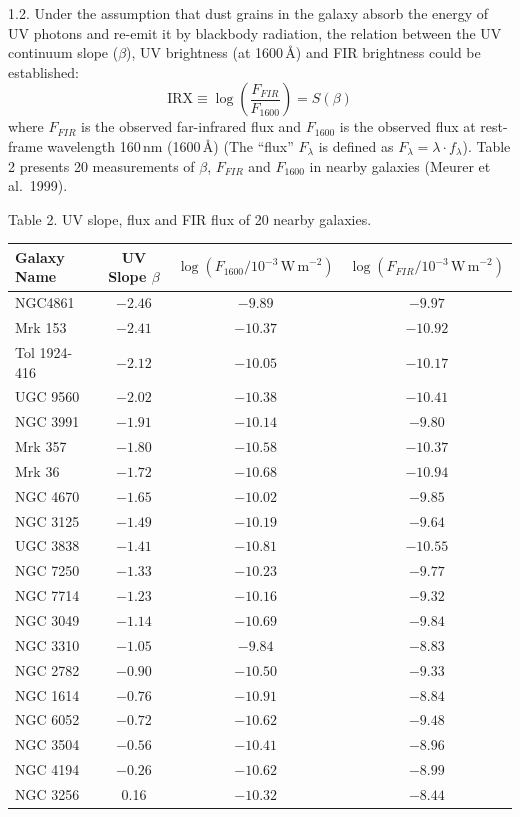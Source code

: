 1.2. Under the assumption that dust grains in the galaxy absorb the energy of
UV photons and re-emit it by blackbody radiation, the relation between the UV
continuum slope ($\beta$), UV brightness (at 1600\,\AA) and FIR brightness
could be established:
\[ \mathrm{IRX} \equiv \log\!\left(\frac{F_{FIR}}{F_{1600}}\right)
   = S(\beta) \]
where $F_{FIR}$ is the observed far-infrared flux and $F_{1600}$ is the
observed flux at rest-frame wavelength 160\,nm (1600\,\AA) (The ``flux''
$F_\lambda$ is defined as $F_\lambda = \lambda \cdot f_\lambda$). Table 2
presents 20 measurements of $\beta$, $F_{FIR}$ and $F_{1600}$ in nearby
galaxies (Meurer et al.\ 1999).

Table 2. UV slope, flux and FIR flux of 20 nearby galaxies.

\begin{center}
\begin{tabular}{l|c|c|c}
Galaxy Name & UV Slope $\beta$
  & $\log(F_{1600}/10^{-3}\,\mathrm{W\,m}^{-2})$
  & $\log(F_{FIR}/10^{-3}\,\mathrm{W\,m}^{-2})$ \\
\hline
NGC4861      & $-2.46$ & $-9.89$  & $-9.97$  \\
Mrk 153      & $-2.41$ & $-10.37$ & $-10.92$ \\
Tol 1924-416 & $-2.12$ & $-10.05$ & $-10.17$ \\
UGC 9560     & $-2.02$ & $-10.38$ & $-10.41$ \\
NGC 3991     & $-1.91$ & $-10.14$ & $-9.80$  \\
Mrk 357      & $-1.80$ & $-10.58$ & $-10.37$ \\
Mrk 36       & $-1.72$ & $-10.68$ & $-10.94$ \\
NGC 4670     & $-1.65$ & $-10.02$ & $-9.85$  \\
NGC 3125     & $-1.49$ & $-10.19$ & $-9.64$  \\
UGC 3838     & $-1.41$ & $-10.81$ & $-10.55$ \\
NGC 7250     & $-1.33$ & $-10.23$ & $-9.77$  \\
NGC 7714     & $-1.23$ & $-10.16$ & $-9.32$  \\
NGC 3049     & $-1.14$ & $-10.69$ & $-9.84$  \\
NGC 3310     & $-1.05$ & $-9.84$  & $-8.83$  \\
NGC 2782     & $-0.90$ & $-10.50$ & $-9.33$  \\
NGC 1614     & $-0.76$ & $-10.91$ & $-8.84$  \\
NGC 6052     & $-0.72$ & $-10.62$ & $-9.48$  \\
NGC 3504     & $-0.56$ & $-10.41$ & $-8.96$  \\
NGC 4194     & $-0.26$ & $-10.62$ & $-8.99$  \\
NGC 3256     & 0.16    & $-10.32$ & $-8.44$  \\
\end{tabular}
\end{center}


